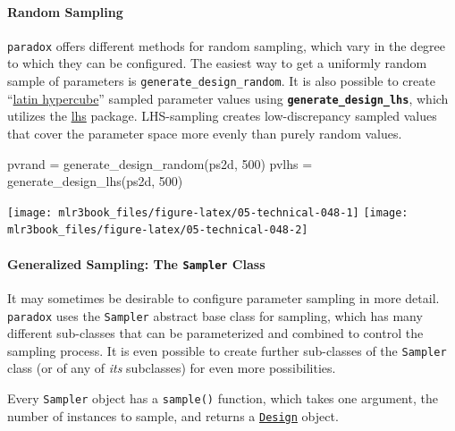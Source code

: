 \documentclass[]{article}
\newenvironment{Shaded}{}{}
\newcommand{\DecValTok}[1]{#1}
\newcommand{\KeywordTok}[1]{\textcolor[rgb]{0.00,0.00,1.00}{#1}}
\newcommand{\NormalTok}[1]{#1}
\newcommand{\StringTok}[1]{\textcolor[rgb]{0.00,0.50,0.50}{#1}}
\let\oldparagraph\paragraph
\renewcommand{\paragraph}[1]{\oldparagraph{#1}\mbox{}}
\renewenvironment{Shaded} {\begin{snugshade}\small} {\end{snugshade}}
\begin{document}
\hypertarget{random-sampling}{%
\paragraph{Random Sampling}\label{random-sampling}}

\texttt{paradox} offers different methods for random sampling, which vary in the degree to which they can be configured.
The easiest way to get a uniformly random sample of parameters is \texttt{generate\_design\_random}.
It is also possible to create ``\href{https://en.wikipedia.org/wiki/Latin_hypercube_sampling}{latin hypercube}'' sampled parameter values using \textbf{\texttt{generate\_design\_lhs}}, which utilizes the \href{https://cran.r-project.org/package=lhs}{lhs} package.
LHS-sampling creates low-discrepancy sampled values that cover the parameter space more evenly than purely random values.

\begin{Shaded}
\begin{Highlighting}[]
\NormalTok{pvrand =}\StringTok{ }\KeywordTok{generate_design_random}\NormalTok{(ps2d, }\DecValTok{500}\NormalTok{)}
\NormalTok{pvlhs =}\StringTok{ }\KeywordTok{generate_design_lhs}\NormalTok{(ps2d, }\DecValTok{500}\NormalTok{)}
\end{Highlighting}
\end{Shaded}

\texttt{[image: mlr3book\_files/figure-latex/05-technical-048-1]} \texttt{[image: mlr3book\_files/figure-latex/05-technical-048-2]}

\hypertarget{generalized-sampling-the-sampler-class}{%
\paragraph{\texorpdfstring{Generalized Sampling: The \texttt{Sampler} Class}{Generalized Sampling: The Sampler Class}}\label{generalized-sampling-the-sampler-class}}

It may sometimes be desirable to configure parameter sampling in more detail.
\texttt{paradox} uses the \texttt{Sampler} abstract base class for sampling, which has many different sub-classes that can be parameterized and combined to control the sampling process.
It is even possible to create further sub-classes of the \texttt{Sampler} class (or of any of \emph{its} subclasses) for even more possibilities.

Every \texttt{Sampler} object has a \texttt{sample()} function, which takes one argument, the number of instances to sample, and returns a \protect\hyperlink{parameter-designs}{\texttt{Design}} object.
\end{document}
